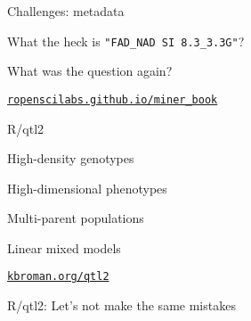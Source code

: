 \documentclass[12pt,t]{beamer}
\begin{document}
\begin{frame}[c]{Challenges: {\color{foreground} metadata}}


  \centerline{What the heck is {\hilit \tt "FAD\_NAD SI 8.3\_3.3G"}?}

\end{frame}



\begin{frame}[c]{}
\centerline{\Large What was the question again?}
\end{frame}



\begin{frame}[c]{}

  \vspace*{5mm}



\vspace{3mm}

\hfill \href{https://ropenscilabs.github.io/miner_book}{\scriptsize \lolit \tt ropenscilabs.github.io/miner\_book}

\end{frame}



\begin{frame}[c]{R/qtl2}

\vspace*{-16.2mm}

  \vspace{21mm}

  \bbi
\item High-density genotypes
\item High-dimensional phenotypes
\item Multi-parent populations
\item Linear mixed models
  \ei

  \vspace{25mm}

\hfill \href{https://kbroman.org/qtl2}{\small \tt kbroman.org/qtl2}

\end{frame}



\begin{frame}[c]{R/qtl2: \color{foreground} Let's not make the same mistakes}

  \bbi
{}
\ei

\end{frame}
\end{document}
